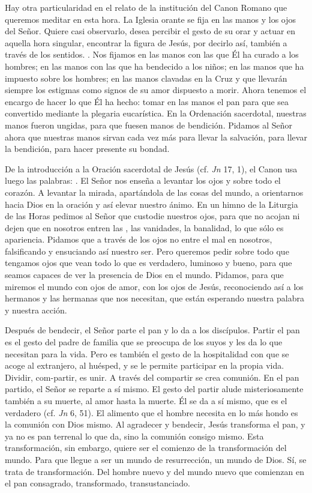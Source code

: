 \begin{body}
Hay otra particularidad en el relato de la institución del Canon Romano que queremos meditar en esta hora. La Iglesia orante se fija en las manos y los ojos del Señor. Quiere casi observarlo, desea percibir el gesto de su orar y actuar en aquella hora singular, encontrar la figura de Jesús, por decirlo así, también a través de los sentidos. . Nos fijamos en las manos con las que Él ha curado a los hombres; en las manos con las que ha bendecido a los niños; en las manos que ha impuesto sobre los hombres; en las manos clavadas en la Cruz y que llevarán siempre los estigmas como signos de su amor dispuesto a morir. Ahora tenemos el encargo de hacer lo que Él ha hecho: tomar en las manos el pan para que sea convertido mediante la plegaria eucarística. En la Ordenación sacerdotal, nuestras manos fueron ungidas, para que fuesen manos de bendición. Pidamos al Señor ahora que nuestras manos sirvan cada vez más para llevar la salvación, para llevar la bendición, para hacer presente su bondad.

De la introducción a la Oración sacerdotal de Jesús (cf. \textit{Jn} 17, 1), el Canon usa luego las palabras: . El Señor nos enseña a levantar los ojos y sobre todo el corazón. A levantar la mirada, apartándola de las cosas del mundo, a orientarnos hacia Dios en la oración y así elevar nuestro ánimo. En un himno de la Liturgia de las Horas pedimos al Señor que custodie nuestros ojos, para que no acojan ni dejen que en nosotros entren las , las vanidades, la banalidad, lo que sólo es apariencia. Pidamos que a través de los ojos no entre el mal en nosotros, falsificando y ensuciando así nuestro ser. Pero queremos pedir sobre todo que tengamos ojos que vean todo lo que es verdadero, luminoso y bueno, para que seamos capaces de ver la presencia de Dios en el mundo. Pidamos, para que miremos el mundo con ojos de amor, con los ojos de Jesús, reconociendo así a los hermanos y las hermanas que nos necesitan, que están esperando nuestra palabra y nuestra acción.

Después de bendecir, el Señor parte el pan y lo da a los discípulos. Partir el pan es el gesto del padre de familia que se preocupa de los suyos y les da lo que necesitan para la vida. Pero es también el gesto de la hospitalidad con que se acoge al extranjero, al huésped, y se le permite participar en la propia vida. Dividir, com-partir, es unir. A través del compartir se crea comunión. En el pan partido, el Señor se reparte a sí mismo. El gesto del partir alude misteriosamente también a su muerte, al amor hasta la muerte. Él se da a sí mismo, que es el verdadero  (cf. \textit{Jn} 6, 51). El alimento que el hombre necesita en lo más hondo es la comunión con Dios mismo. Al agradecer y bendecir, Jesús transforma el pan, y ya no es pan terrenal lo que da, sino la comunión consigo mismo. Esta transformación, sin embargo, quiere ser el comienzo de la transformación del mundo. Para que llegue a ser un mundo de resurrección, un mundo de Dios. Sí, se trata de transformación. Del hombre nuevo y del mundo nuevo que comienzan en el pan consagrado, transformado, transustanciado.


\end{body}
